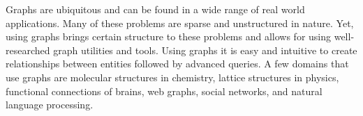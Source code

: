 



Graphs are ubiquitous and can be found in a wide range of real world applications.
Many of these problems are sparse and unstructured in nature. Yet, using graphs brings certain structure to these problems and allows for using well-researched graph utilities and tools. Using graphs it is easy and intuitive to create relationships between entities followed by advanced queries. A few domains that use graphs are molecular structures in chemistry, lattice structures in physics, functional connections of brains, web graphs, social networks, and natural language processing.

